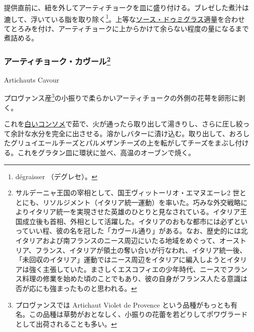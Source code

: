 \begin{recette}
提供直前に、紐を外してアーティチョークを皿に盛り付ける。ブレゼした煮汁は漉して、浮いている脂を取り除く\footnote{dégraisser
  （デグレセ）。}。上等な\protect\hyperlink{sauce-demi-glace}{ソース・ドゥミグラス}適量を合わせてとろみを付け、アーティチョークに上からかけて余らない程度の量になるまで煮詰める。

\atoaki{}

\hypertarget{artichauts-cavour}{%
\subsubsection[アーティチョーク・カヴール]{\texorpdfstring{アーティチョーク・カヴール\footnote{サルデーニャ王国の宰相として、国王ヴィットーリオ・エマヌエーレ2
  世ととにも、リソルジメント（イタリア統一運動）を率いた。巧みな外交戦略によりイタリア統一を実現させた英雄のひとりと見なされている。イタリア王国成立後も首相、外相として活躍した。イタリアのおもな都市には必ずといっていい程、彼の名を冠した「カヴール通り」がある。なお、歴史的には北イタリアおよび南フランスのニース周辺にいたる地域をめぐって、オーストリア、フランス、イタリアが領土の奪い合いが行なわれ、イタリア統一後、「未回収のイタリア」運動ではニース周辺をイタリアに編入しようとイタリアは強く主張していた。まさしくエスコフィエの少年時代、ニースでフランス料理の修業を始めた頃のことでもあり、彼の自身がフランス人たる意識は否が応にも強まったものと思われる。}}{アーティチョーク・カヴール}}\label{artichauts-cavour}}

\begin{frsubenv}

Artichauts Cavour

\end{frsubenv}


プロヴァンス産\footnote{プロヴァンスでは Artichaut Violet de Provence
  という品種がもっとも有名。この品種は草勢がおとなしく、小振りの花蕾を若どりしてポワヴラードとして出荷されることも多い。}の小振りで柔らかいアーティチョークの外側の花萼を卵形に剥く。

これを\protect\hyperlink{consomme-blanc}{白いコンソメ}で茹で、火が通ったら取り出して湯きりし、さらに圧し絞って余計な水分を完全に出させる。溶かしバターに漬け込む。取り出して、おろしたグリュイエールチーズとパルメザンチーズの上を転がしてチーズをまぶし付ける。これをグラタン皿に環状に並べ、高温のオーブンで焼く。


\end{recette}
